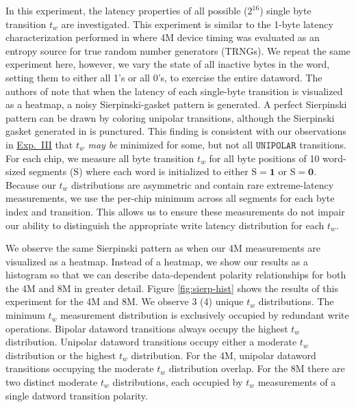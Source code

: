 In this experiment, the latency properties of all possible ($2^{16}$) single byte transition $t_w$ are investigated.
This experiment is similar to the 1-byte latency characterization performed in \cite{tolga2024trng} where 4M device timing was evaluated as an entropy source for true random number generators (TRNGs). We repeat the same experiment here, however, we vary the state of all inactive bytes in the word, setting them to either all 1's or all 0's, to exercise the entire dataword. The authors of \cite{tolga2024trng} note that when the latency of each single-byte transition is visualized as a heatmap, a noisy Sierpinski-gasket pattern is generated. A perfect Sierpinski pattern can be drawn by coloring unipolar transitions, although the Sierpinski gasket generated in \cite{tolga2024trng} is punctured. This finding is consistent with our observations in \hyperref[exp:iii]{Exp.~III} that $t_w$ \emph{may be} minimized for some, but not all $\texttt{UNIPOLAR}$ transitions.
For each chip, we measure all byte transition $t_w$ for all byte positions of 10 word-sized segments ($\mathrm{S}$) where each word is initialized to either $\mathrm{S}=\mathbf{1}$ or $\mathrm{S}=\mathbf{0}$. Because our $t_w$ distributions are asymmetric and contain rare extreme-latency measurements, we use the per-chip minimum across all segments for each byte index and transition. This allows us to ensure these measurements do not impair our ability to distinguish the appropriate write latency distribution for each $t_w$.

We observe the same Sierpinski pattern as \cite{tolga2024trng} when our 4M measurements are visualized as a heatmap. Instead of a heatmap, we show our results as a histogram so that we can describe data-dependent polarity relationships for both the 4M and 8M in greater detail. Figure \ref{fig:sierp-hist} shows the results of this experiment for the 4M and 8M. We observe 3 (4) unique $t_w$ distributions. The minimum $t_w$ measurement distribution is exclusively occupied by redundant write operations. Bipolar dataword transitions always occupy the highest $t_w$ distribution. Unipolar dataword transitions occupy either a moderate $t_w$ distribution or the highest $t_w$ distribution. For the 4M, unipolar dataword transitions occupying the moderate $t_w$ distribution overlap. For the 8M there are two distinct moderate $t_w$ distributions, each occupied by $t_w$ measurements of a single datword transition polarity. 

